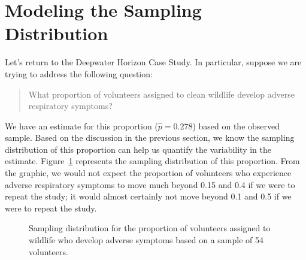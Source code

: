 \documentclass[
  letterpaper,
  DIV=11,
  numbers=noendperiod]{scrreprt}
\theoremstyle{definition}
\theoremstyle{definition}
\theoremstyle{plain}
\theoremstyle{remark}
\begin{document}
\section{Modeling the Sampling
Distribution}\label{modeling-the-sampling-distribution}

Let's return to the Deepwater Horizon Case Study. In particular, suppose
we are trying to address the following question:

\begin{quote}
What proportion of volunteers assigned to clean wildlife develop adverse
respiratory symptoms?
\end{quote}

We have an estimate for this proportion (\(\widehat{p} = 0.278\)) based
on the observed sample. Based on the discussion in the previous section,
we know the sampling distribution of this proportion can help us
quantify the variability in the estimate.
Figure~\ref{fig-samplingdistns-deepwater-histogram} represents the
sampling distribution of this proportion. From the graphic, we would not
expect the proportion of volunteers who experience adverse respiratory
symptoms to move much beyond 0.15 and 0.4 if we were to repeat the
study; it would almost certainly not move beyond 0.1 and 0.5 if we were
to repeat the study.

\begin{figure}


\caption{\label{fig-samplingdistns-deepwater-histogram}Sampling
distribution for the proportion of volunteers assigned to wildlife who
develop adverse symptoms based on a sample of 54 volunteers.}

\end{figure}%
\end{document}
